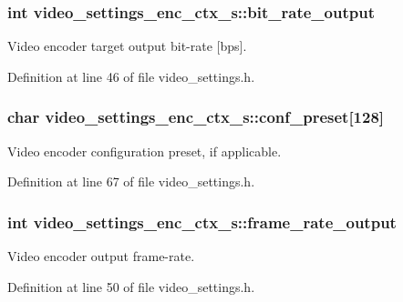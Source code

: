 \subsubsection[{\texorpdfstring{bit\+\_\+rate\+\_\+output}{bit_rate_output}}]{\setlength{\rightskip}{0pt plus 5cm}int video\+\_\+settings\+\_\+enc\+\_\+ctx\+\_\+s\+::bit\+\_\+rate\+\_\+output}\hypertarget{structvideo__settings__enc__ctx__s_a050b9b94d11483b88515d3c5ad524df4}{}\label{structvideo__settings__enc__ctx__s_a050b9b94d11483b88515d3c5ad524df4}
Video encoder target output bit-\/rate \mbox{[}bps\mbox{]}. 

Definition at line 46 of file video\+\_\+settings.\+h.

\subsubsection[{\texorpdfstring{conf\+\_\+preset}{conf_preset}}]{\setlength{\rightskip}{0pt plus 5cm}char video\+\_\+settings\+\_\+enc\+\_\+ctx\+\_\+s\+::conf\+\_\+preset\mbox{[}128\mbox{]}}\hypertarget{structvideo__settings__enc__ctx__s_ac1eb98f4a736449a6b706fd0de013209}{}\label{structvideo__settings__enc__ctx__s_ac1eb98f4a736449a6b706fd0de013209}
Video encoder configuration preset, if applicable. 

Definition at line 67 of file video\+\_\+settings.\+h.

\subsubsection[{\texorpdfstring{frame\+\_\+rate\+\_\+output}{frame_rate_output}}]{\setlength{\rightskip}{0pt plus 5cm}int video\+\_\+settings\+\_\+enc\+\_\+ctx\+\_\+s\+::frame\+\_\+rate\+\_\+output}\hypertarget{structvideo__settings__enc__ctx__s_a374976580e00d9b0a51ea5a87e367a27}{}\label{structvideo__settings__enc__ctx__s_a374976580e00d9b0a51ea5a87e367a27}
Video encoder output frame-\/rate. 

Definition at line 50 of file video\+\_\+settings.\+h.

